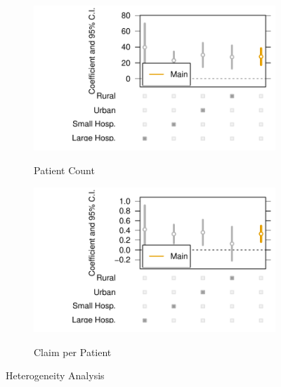 \documentclass[12pt]{article}
\begin{document}
\begin{figure}[t!]
\medskip
\begin{subfigure}{0.48\textwidth}
\caption{Patient Count} 
\includegraphics[width=\linewidth]{Objects/patient_heterog.pdf}
\label{fig:e}
\end{subfigure}\hspace*{\fill}
\begin{subfigure}{0.48\textwidth}
\caption{Claim per Patient}
\includegraphics[width=\linewidth]{Objects/claim_per_patient_heterog.pdf}
 \label{fig:f}
\end{subfigure}

\caption{Heterogeneity Analysis} \label{fig:1}
\end{figure}
\end{document}
